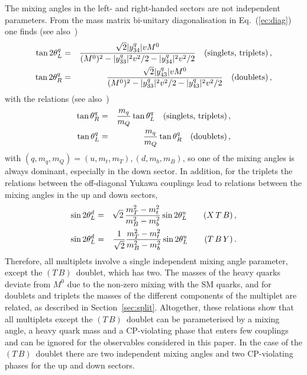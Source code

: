 \documentclass[12pt,a4paper]{article}
\newcommand{\tb}{$(T\,B)$}
\begin{document}
The mixing angles in the left- and right-handed sectors are not independent parameters. From the mass matrix bi-unitary diagonalisation in Eq.~(\ref{ec:diag}) one finds (see also~\cite{Fajfer:2013wca})
\begin{eqnarray}
\tan 2 \theta_L^q & = & \frac{\sqrt{2} |y_{34}^q| v M^0}{(M^0)^2-|y_{33}^q|^2 v^2/2 - |y_{34}^q|^2 v^2/2} \quad \text{(singlets, triplets)} \,, \notag \\
\tan 2 \theta_R^q & = & \ \frac{\sqrt{2}  |y_{43}^q| v M^0}{(M^0)^2-|y_{33}^q|^2 v^2/2 - |y_{43}^q|^2 v^2/2} \quad \text{(doublets)} \,, 
\label{ec:angle1}
\end{eqnarray}
with the relations (see also~\cite{Dawson:2012di,Fajfer:2013wca,Atre:2011ae})
\begin{eqnarray}
\tan \theta_R^q & = & \frac{m_q}{m_Q} \tan \theta_L^q \quad \text{(singlets, triplets)} \,, \notag \\
\tan \theta_L^q & = & \frac{m_q}{m_Q} \tan \theta_R^q \quad \text{(doublets)} \,, 
\label{ec:rel-angle1}
\end{eqnarray}
with $(q,m_q,m_Q) = (u,m_t,m_T),(d,m_b,m_B)$, so one of the mixing angles is always dominant, especially in the down sector. In addition, for the triplets the relations between the off-diagonal Yukawa couplings lead to relations between the mixing angles in the up and down sectors,
\begin{eqnarray}
\sin 2\theta_L^d & = & \sqrt{2} \, \frac{m_T^2-m_t^2}{m_B^2-m_b^2} \sin 2 \theta_L^u \quad \quad (X\,T\,B) \,, \notag \\
\sin 2\theta_L^d & = & \frac{1}{\sqrt{2}} \frac{m_T^2-m_t^2}{m_B^2-m_b^2} \sin 2 \theta_L^u \quad \quad (T\,B\,Y) \,.
\end{eqnarray}
Therefore, all multiplets involve a single independent mixing angle parameter, except the \tb\ doublet, which has two. The masses of the heavy quarks deviate from $M^0$ due to the non-zero mixing with the SM quarks, and for doublets and triplets the masses of the different components of the multiplet are related, as described in Section~\ref{sec:split}. Altogether, these relations show that all multiplets except the \tb\ doublet can be parameterised by a mixing angle, a heavy quark mass and a CP-violating phase that enters few couplings and can be ignored for the observables considered in this paper. In the case of the \tb\ doublet there are two independent mixing angles and two CP-violating phases for the up and down sectors.

\end{document}
